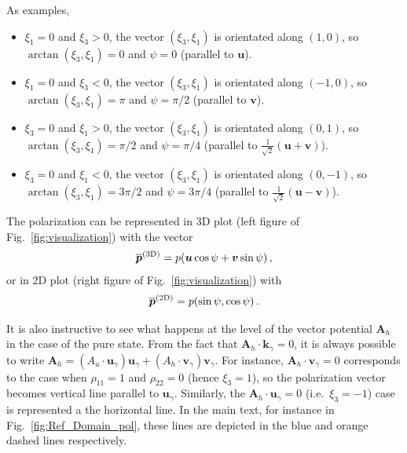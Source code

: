 \documentclass[a4paper,11pt]{article}
\begin{document}
As examples,
\begin{itemize}
    \item $\xi_{1} = 0 $ and $ \xi_{3} > 0$, the vector $(\xi_{3}, \xi_{1})$ is orientated along $ (1,0) $, so $\arctan(\xi_{3}, \xi_{1}) = 0$ and $\psi = 0$ (parallel to $ \bm{u} $).

    \item $\xi_{1} = 0 $ and $ \xi_{3} < 0$, the vector $(\xi_{3}, \xi_{1})$ is orientated along $ (-1,0) $, so $\arctan(\xi_{3}, \xi_{1}) = \pi$ and $\psi = \pi/2$ (parallel to $ \bm{v} $).

    \item $\xi_{3} = 0 $ and $ \xi_{1} > 0$, the vector $(\xi_{3}, \xi_{1})$ is orientated along $ (0,1) $, so $\arctan(\xi_{3}, \xi_{1}) = \pi/2$ and $\psi = \pi/4$ (parallel to $ \frac{1}{\sqrt{2}} (\bm{u} + \bm{v}) $).

     \item $\xi_{3} = 0 $ and $ \xi_{1} < 0$, the vector $(\xi_{3}, \xi_{1})$ is orientated along $ (0,-1) $, so $\arctan(\xi_{3}, \xi_{1}) = 3\pi/2$ and $\psi = 3\pi/4$ (parallel to $ \frac{1}{\sqrt{2}} (\bm{u} - \bm{v}) $).
\end{itemize}




The polarization can be represented in 3D plot (left figure of Fig.~\ref{fig:visualization}) with the vector
%
\begin{align}
    \overline{\bm{p}}^{\rm (3D)} = p ( \bm{u} \cos \psi  + \bm{v} \sin \psi  ) \, ,
\end{align}
%
or in 2D plot (right figure of Fig.~\ref{fig:visualization}) with
\begin{align}
    \overline{\bm{p}}^{\rm (2D)} = p ( \sin \psi, \cos \psi   ) \,.
\end{align}


It is also instructive to see what happens at the level of the vector potential $ \bm{A}_{h} $ in the case of the pure state. 
%
From the fact that $ \bm{A}_{h} \cdot \bm{k}_{\gamma} = 0  $, it is always possible to write $ \bm{A}_{h} = ( A_{u} \cdot \bm{u}_{\gamma} ) \bm{u}_{\gamma} + (A_{h} \cdot \bm{v}_{\gamma}) \bm{v}_{\gamma} $. For instance, $ \bm{A}_{h} \cdot \bm{v}_{\gamma} = 0 $ corresponds to the case when $\rho_{11} = 1 $ and $ \rho_{22} = 0$ (hence $ \xi_{3} = 1 $), so the polarization vector becomes vertical line parallel to $ \bm{u}_{\gamma} $.
%
Similarly, the $ \bm{A}_{h} \cdot \bm{u}_{\gamma} = 0 $ (i.e.\ $ \xi_{3} = -1 $) case is represented a the horizontal line.
%
In the main text, for instance in Fig.~\ref{fig:Ref_Domain_pol}, these lines are depicted in the blue and orange dashed lines respectively.
\end{document}
